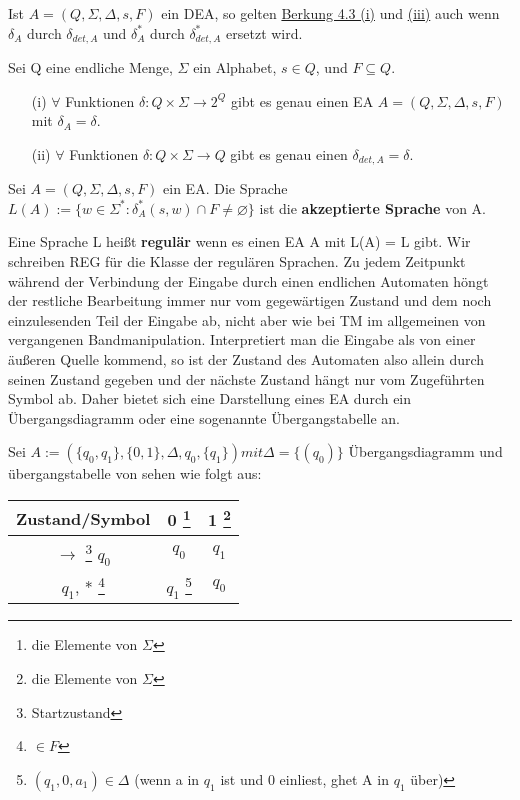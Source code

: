     Ist \(A = (Q, \Sigma, \Delta, s, F)\) ein DEA, so gelten \hyperref[subsec:4.3]{Berkung 4.3 (i)} und \hyperref[subsec:4.3]{(iii)} auch wenn \(\delta_{A}\) durch \(\delta_{det, A}\) und \(\delta_{A}^{*}\) durch \(\delta_{det, A}^{*}\) ersetzt wird.

    Sei Q eine endliche Menge, \(\Sigma\) ein Alphabet, \(s\in Q\), und \(F\subseteq Q\). 
    \begin{itemize}
        \item [(i)] \(\forall\) Funktionen \(\delta : Q \times \Sigma \rightarrow 2^{Q}\) gibt es genau einen EA \(A = (Q, \Sigma, \Delta, s, F)\) mit \(\delta_{A} = \delta\).
        \item [(ii)] \(\forall\) Funktionen \(\delta : Q \times \Sigma \rightarrow Q\) gibt es genau einen \(\delta_{det, A} = \delta\). 
    \end{itemize}

    Sei \(A = (Q, \Sigma, \Delta, s, F)\) ein EA. Die Sprache \(L(A) := \{w \in \Sigma^{*} : \delta_{A}^{*}(s, w)\cap F \neq \varnothing \}\) ist die \textbf{akzeptierte Sprache} von A.

    Eine Sprache L heißt \textbf{regulär} wenn es einen EA A mit L(A) = L gibt. Wir schreiben REG für die Klasse der regulären Sprachen. Zu jedem Zeitpunkt während der Verbindung der Eingabe durch einen endlichen Automaten höngt der restliche Bearbeitung immer nur vom gegewärtigen Zustand und dem noch einzulesenden Teil der Eingabe ab, nicht aber wie bei TM im allgemeinen von vergangenen Bandmanipulation. Interpretiert man die Eingabe als von einer äußeren Quelle kommend, so ist der  Zustand des Automaten also allein durch seinen Zustand gegeben und der nächste Zustand hängt nur vom Zugeführten Symbol ab. Daher bietet sich eine Darstellung eines EA durch ein Übergangsdiagramm oder eine sogenannte Übergangstabelle an.

\newpage
{}
    Sei \(A := (\{q_{0}, q_{1}\}, \{0, 1\}, \Delta, q_{0}, \{q_{1}\}) mit \Delta = \{(q_{0})\}\)
    Übergangsdiagramm und übergangstabelle von sehen wie folgt aus:
    \begin{center}
        \begin{tabular}{|c|c|c|}
            \hline
            \textbf{Zustand/Symbol} & \textbf{0} \footnote{die Elemente von \(\Sigma\)} & \textbf{1} \footnote{die Elemente von \(\Sigma\)} \\
            \hline
            \( \rightarrow\) \footnote{Startzustand} \(q_{0}\) & \(q_{0}\) & \(q_{1}\) \\
            \hline
            \(q_{1}\), * \footnote{\(\in F\)} & \(q_{1}\) \footnote{\((q_1, 0, a_1) \in \Delta\) (wenn a in \(q_1\) ist und 0 einliest, ghet A in \(q_1\) über)} & \(q_{0}\) \\
            \hline
        \end{tabular}
    \end{center}

